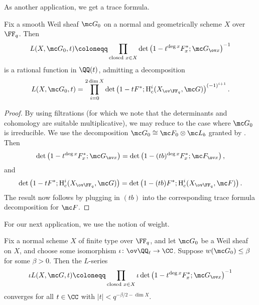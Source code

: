 \documentclass[../notes.tex]{subfiles}
\begin{document}
As another application, we get a trace formula.
\begin{corollary} \label{cor:weil-l-func-rational}
	Fix a smooth Weil sheaf $\mc G_0$ on a normal and geometrically scheme $X$ over $\FF_q$. Then
	\[L(X,\mc G_0,t)\coloneqq\prod_{\text{closed }x\in X}\det\left(1-t^{\deg x}F_x^*;\mc G_{\ov x}\right)^{-1}\]
	is a rational function in $\QQ(t)$, admitting a decomposition
	\[L(X,\mc G_0,t)=\prod_{i=0}^{2\dim X}\det\left(1-tF^*;\mathrm H^i_c(X_{\ov\FF_q},\mc G)\right)^{(-1)^{i+1}}.\]
\end{corollary}
\begin{proof}
	By using filtrations (for which we note that the determinants and cohomology are suitable multiplicative), we may reduce to the case where $\mc G_0$ is irreducible. We use the decomposition $\mc G_0\cong\mc F_0\otimes\mc L_b$ granted by . Then
	\[\det\left(1-t^{\deg x}F_x^*;\mc G_{\ov x}\right)=\det\left(1-(tb)^{\deg x}F_x^*;\mc F_{\ov x}\right),\]
	and
	\[\det\left(1-tF^*;\mathrm H^i_c(X_{\ov\FF_q},\mc G)\right)=\det\left(1-(tb)F^*;\mathrm H^i_c(X_{\ov\FF_q},\mc F)\right).\]
	The result now follows by plugging in $(tb)$ into the corresponding trace formula decomposition for $\mc F$.
\end{proof}
For our next application, we use the notion of weight.
\begin{lemma} \label{lem:l-func-converge-by-weight}
	Fix a normal scheme $X$ of finite type over $\FF_q$, and let $\mc G_0$ be a Weil sheaf on $X$, and choose some isomorphism $\iota\colon\ov\QQ_\ell\to\CC$. Suppose $w(\mc G_0)\le\beta$ for some $\beta>0$. Then the $L$-series
	\[\iota L(X,\mc G,t)\coloneqq\prod_{\text{closed }x\in X}\iota\det\left(1-t^{\deg x}F_x^*;\mc G_{\ov x}\right)^{-1}\]
	converges for all $t\in\CC$ with $\left|t\right|<q^{-\beta/2-\dim X}$.
\end{lemma}
\end{document}
